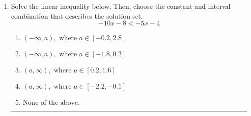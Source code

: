 \documentclass[14pt]{extbook}
\newcommand{\litem}[1]{\item#1\hspace*{-1cm}\rule{\textwidth}{0.4pt}}
\begin{document}
\begin{enumerate}
{\begin{enumerate}[label=\Alph*.]
\end{enumerate} }
\litem{
Solve the linear inequality below. Then, choose the constant and interval combination that describes the solution set.\[ -10x -8 < -5x -4 \]\begin{enumerate}[label=\Alph*.]
\item \( (-\infty, a), \text{ where } a \in [-0.2, 2.8] \)
\item \( (-\infty, a), \text{ where } a \in [-1.8, 0.2] \)
\item \( (a, \infty), \text{ where } a \in [0.2, 1.6] \)
\item \( (a, \infty), \text{ where } a \in [-2.2, -0.1] \)
\item \( \text{None of the above}. \)

\end{enumerate} }
\end{enumerate}
\end{document}
